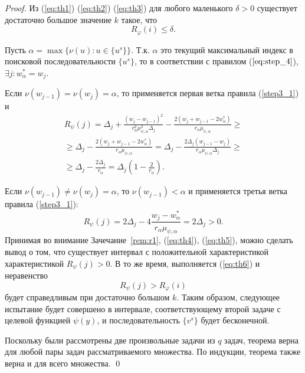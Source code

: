 \begin{proof}
  Из (\ref{eq:th1}) (\ref{eq:th2}) (\ref{eq:th3}) для любого маленького \(\delta > 0\) существует достаточно большое значение \(k\) такое, что
  \begin{equation}
    R_\varphi(i)\leqslant \delta.
    \label{eq:th6}
  \end{equation}

  Пусть \(\alpha = \max\{\nu(u):u\in\{u^s\}\}\). Т.к. \(\alpha\) это текущий максимальный индекс
  в поисковой последовательности \(\{u^s\}\), то в соответствии с правилом (\(\ref{eq:step_4}\)), \(\exists j: w^*_\alpha=w_j\).

  Если \(\nu(w_{j-1})=\nu(w_{j})=\alpha\), то применяется первая ветка правила (\ref{step3_1}) и
  \begin{equation}
    \begin{array}{l}
      R_\psi(j)=\Delta_j + \frac{(w_j-w_{j-1})^2}{r_\alpha^2\mu_{\psi,\alpha}^2\Delta_j}
        - \frac{2(w_j+w_{j-1}-2w^*_\alpha)}{r_\alpha\mu_{\psi,\alpha}} \geqslant \\
        \geqslant\Delta_j - \frac{2(w_j+w_{j-1}-2w^*_\alpha)}{r_\alpha\mu_{\psi,\alpha}} =
        \Delta_j - \frac{2\Delta_j(w_{j-1}-w_j)}{r_\alpha\mu_{\psi,\alpha}\Delta_j} \geqslant\\
        \geqslant \Delta_j - \frac{2\Delta_j}{r_\alpha} = \Delta_j\left(1-\frac{2}{r_\alpha}\right).
      \end{array}
    \label{eq:th4}
  \end{equation}

  Если \(\nu(w_{j-1})\ne\nu(w_{j})=\alpha\), то \(\nu(w_{j-1})<\alpha\) и применяется третья ветка правила (\ref{step3_1}):
  \begin{equation}
    R_\psi(j)=2\Delta_j - 4 \frac{w_j-w^*_{\alpha}}{r_\alpha \mu_{\psi,\alpha}}=2\Delta_j > 0.
    \label{eq:th5}
  \end{equation}
  Принимая во внимание Зачечание~\ref{rem:r1}, (\ref{eq:th4}), (\ref{eq:th5}), можно сделать вывод о том, что
  существует интервал с положительной характеристикой характеристикой \(R_\psi(j)>0\). В то же время, выполняется (\ref{eq:th6})
  и неравенство
  \begin{displaymath}
    R_\psi(j) > R_\varphi(i)
  \end{displaymath}
  будет справедливым при достаточно большом \(k\). Таким образом, следующее испытание будет совершено
  в интервале, соответствующему второй задаче с целевой функцией \(\psi(y)\), и последовательность \(\{v^s\}\) будет бесконечной.

  Поскольку были рассмотрены две произвольные задачи из \(q\) задач, теорема верна для любой пары задач рассматриваемого множества.
  По индукции, теорема также верна и для всего множества.
\qed
\end{proof}


